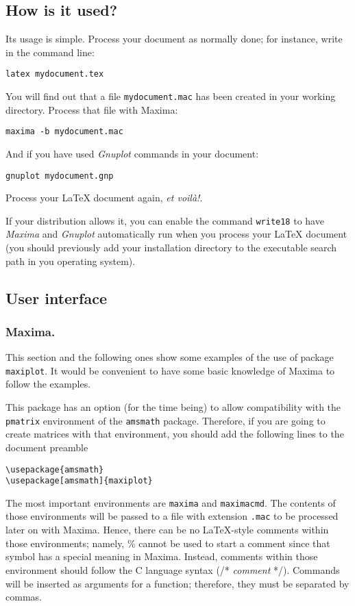 \documentclass[11pt,a4paper]{article}
\def\Maxima{\emph{Maxima}}
\def\Gnuplot{\emph{Gnuplot}}
\begin{document}
\subsection{How is it used?}
Its usage is simple. Process your document as normally done; for
instance, write in the command line:

\texttt{latex mydocument.tex}

You will find out that a file \texttt{mydocument.mac} has been
created in your working directory. Process that file with Maxima:

\texttt{maxima -b mydocument.mac}

And if you have used \Gnuplot{} commands in your document:

\texttt{gnuplot mydocument.gnp}

Process your \LaTeX{} document again, \textit{et voil\`a!}.

If your distribution allows it, you can enable the command
\texttt{write18} to have \Maxima{} and \Gnuplot{} automatically run
when you process your \LaTeX{} document (you should previously add
your installation directory to the executable search path in you
operating system). 

\subsection{User interface}
\subsubsection{Maxima.}
This section and the following ones show some examples of the use of
package \texttt{maxiplot}. It would be convenient to have some basic
knowledge of Maxima to follow the examples.

This package has an option (for the time being) to allow compatibility
with the \texttt{pmatrix} environment of the \texttt{amsmath}
package. Therefore, if you are going to create matrices with that
environment, you should add the following lines to the document preamble
\begin{verbatim}
\usepackage{amsmath}
\usepackage[amsmath]{maxiplot}
\end{verbatim}

The most important environments are \texttt{maxima} and
\texttt{maximacmd}. The contents of those environments will be passed
to a file with extension \texttt{.mac} to be processed later on with
Maxima. Hence, there can be no \LaTeX-style comments within those
environments; namely, \% cannot be used to start a comment since that
symbol has a special meaning in Maxima. Instead, comments within those
environment should follow the C language syntax (/* \textit{comment}
*/). Commands will be inserted as arguments for a function; therefore,
they must be separated by commas.
\end{document}
